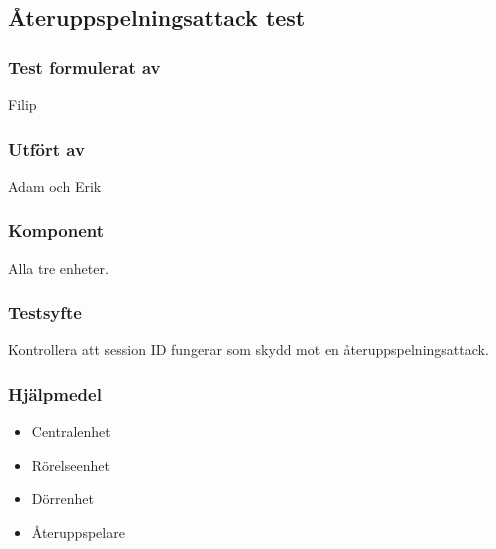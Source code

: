 \clearpage
\subsection{Återuppspelningsattack test}
\label{test:sessionID}

\setlength{\columnsep}{1cm}




\begin{multicols}{2}
\subsubsection*{Test formulerat av}
Filip

\subsubsection*{Utfört av}
Adam och Erik


\end{multicols}
\subsubsection*{Komponent}
Alla tre enheter.


\subsubsection*{Testsyfte}
Kontrollera att session ID fungerar som skydd mot en återuppspelningsattack.


\subsubsection*{Hjälpmedel}
\begin{itemize}
	\item Centralenhet
	\item Rörelseenhet
	\item Dörrenhet
	\item Återuppspelare
\end{itemize}



